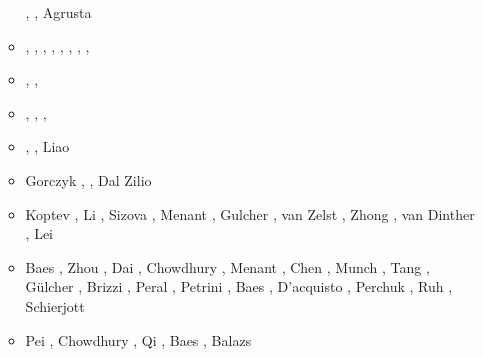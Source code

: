 \begin{itemize}
\begin{scriptsize}
\begin{itemize}
                            \cite{gery13}\cite{milp13},
                            \cite{rugb13}\cite{scdg13},
                            Agrusta \etal \cite{agat13}
\item[\twothousandfourteen] \cite{dugs14}\cite{puge14},
                            \cite{voge14b}\cite{bagb14},
                            \cite{lige14}\cite{stjm14},
                            \cite{malg14}\cite{buge14},
                            \cite{gosk14}\cite{vamd14},
                            \cite{macg14}\cite{basc14},
                            \cite{gobg14}\cite{gery14},
                            \cite{gery14b}\cite{gita14},
                            \cite{sigb14}
\item[\twothousandfifteen] \cite{uewg15}\cite{rula15},
                           \cite{gesb15}\cite{rula15},
                           \cite{kocb15}\cite{hevg15}
\item[\twothousandsixteen] \cite{kobc16}\cite{magc16},
                           \cite{fige16}\cite{mauw16},
                           \cite{duay16}\cite{mesj16},
                           \cite{huwc16}\cite{staj16}
\item[\twothousandseventeen] \cite{mauw17}\cite{kocb17},
                             \cite{vomc17}\cite{shwl17}, 
                             Liao \etal \cite{liwg17}
\item[\twothousandeighteen] Gorczyk \etal \cite{gomb18}, \cite{zhlg18}
                            \cite{masg18}\cite{gebu18}
                            \cite{hegv18}, Dal Zilio \etal \cite{davg18}
\item[\twothousandnineteen] Koptev \etal \cite{kobg19}, Li \etal \cite{ligc19},
                      Sizova \etal \cite{sihf19}, Menant \etal \cite{meag19},
                      Gulcher \etal \cite{gubg19}, van Zelst \etal \cite{vawg19},
                      Zhong \etal \cite{zhli19}, van Dinther \etal \cite{vakf19},
                      Lei \etal \cite{lell19}
\item[\twothousandtwenty] Baes \etal \cite{basg20}, Zhou \etal \cite{zhlg20}, 
                    Dai \etal \cite{dawl20}, Chowdhury \etal \cite{chcg20},
                    Menant \etal \cite{meag20}, Chen \etal \cite{chlc20}, Munch \etal \cite{mugu20}, 
                    Tang \etal \cite{tacm20}, G{\"u}lcher \etal \cite{gugm20}, Brizzi \etal \cite{brvf20}, 
                    Peral \etal \cite{perz20}, Petrini \etal \cite{pegy20}, 
                    Baes \etal \cite{basg20b}, D'acquisto \etal \cite{dadm20},
                    Perchuk \etal \cite{pegz20}, Ruh \cite{ruh20}, Schierjott \etal \cite{sctr20}
\item[\twothousandtwentyone]  Pei \etal \cite{pels21}, Chowdhury \etal \cite{chcg21},
                              Qi \etal \cite{qill21}, Baes \etal \cite{basg21}, 
                              Balazs \etal \cite{bafu21}
\end{itemize}
\end{scriptsize}



\end{itemize}
